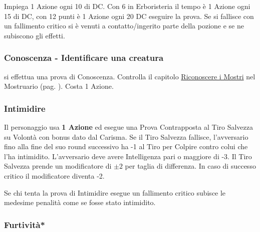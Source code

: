 \begin{multicols}{2}
Impiega 1 Azione ogni 10 di DC. Con 6 in Erboristeria il tempo è 1 Azione ogni 15 di DC, con 12 punti è 1 Azione ogni 20 DC eseguire la prova. Se si fallisce con un fallimento critico si è venuti a contatto/ingerito parte della pozione e se ne subiscono gli effetti.

\titlespacing*{\subsubsection}{0pt}{0.5em}{0.5em}\subsubsection*{Conoscenza - Identificare una creatura} \label{riconosceremostro}\hypertarget{riconosceremostro}{}
si effettua una prova di Conoscenza. Controlla il capitolo \hyperlink{riconoscereimostri}{Riconoscere i Mostri} nel Mostruario (pag. \pageref{riconoscereimostri}). Costa 1 Azione.

\titlespacing*{\subsubsection}{0pt}{0.5em}{0.5em}\subsubsection*{Intimidire}\label{intimidire}
Il personaggio usa \textbf{1 Azione} ed esegue una Prova Contrapposta al Tiro Salvezza su Volontà con bonus dato dal Carisma.
Se il Tiro Salvezza fallisce, l'avversario fino alla fine del suo round successivo ha -1 al Tiro per Colpire contro colui che l'ha intimidito. L'avversario deve avere Intelligenza pari o maggiore di -3. Il Tiro Salvezza prende un modificatore di $\pm2$ per taglia di differenza. In caso di successo critico il modificatore diventa -2.

Se chi tenta la prova di Intimidire esegue un fallimento critico subisce le medesime penalità come se fosse stato intimidito.


%

\titlespacing*{\subsubsection}{0pt}{0.5em}{0.5em}\subsubsection*{Furtività*}  \label{furtivita}


\end{multicols}
